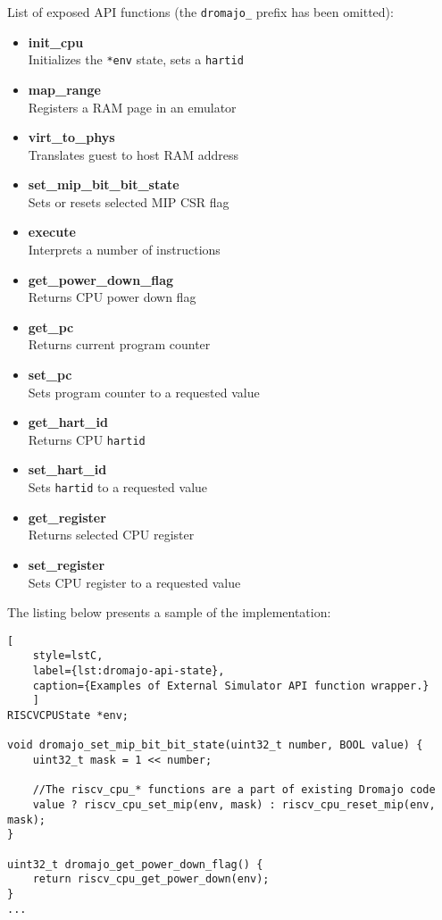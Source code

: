 \vspace{10px}
\noindent
List of exposed API functions (the \texttt{dromajo\_} prefix has been omitted):
\begin{multicols}{2}
    \begin{itemize}
        \item{\textbf{init\_cpu}\\Initializes the \texttt{*env} state, sets a \texttt{hartid} }
        \item{\textbf{map\_range}\\Registers a RAM page in an emulator}
        \item{\textbf{virt\_to\_phys}\\Translates guest to host RAM address}
        \item{\textbf{set\_mip\_bit\_bit\_state}\\Sets or resets selected MIP CSR flag}
        \item{\textbf{execute}\\Interprets a number of instructions}
        \item{\textbf{get\_power\_down\_flag}\\Returns CPU power down flag}
        \item{\textbf{get\_pc}\\Returns current program counter}
        \item{\textbf{set\_pc}\\Sets program counter to a requested value}
        \item{\textbf{get\_hart\_id}\\Returns CPU \texttt{hartid}}
        \item{\textbf{set\_hart\_id}\\Sets \texttt{hartid} to a requested value}
        \item{\textbf{get\_register}\\Returns selected CPU register}
        \item{\textbf{set\_register}\\Sets CPU register to a requested value}
    \end{itemize}
\end{multicols}

\noindent
The listing below presents a sample of the implementation:

\begin{lstlisting}[
    style=lstC,
    label={lst:dromajo-api-state},
    caption={Examples of External Simulator API function wrapper.}
    ]
RISCVCPUState *env;

void dromajo_set_mip_bit_bit_state(uint32_t number, BOOL value) {
    uint32_t mask = 1 << number;

    //The riscv_cpu_* functions are a part of existing Dromajo code
    value ? riscv_cpu_set_mip(env, mask) : riscv_cpu_reset_mip(env, mask);
}

uint32_t dromajo_get_power_down_flag() {
    return riscv_cpu_get_power_down(env);
}
...
\end{lstlisting}

